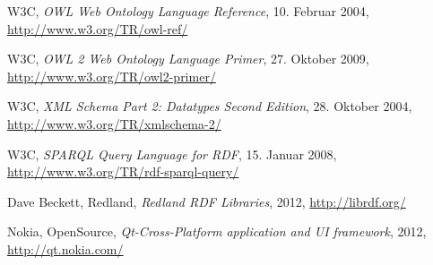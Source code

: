 \documentclass[
    11pt,
    latin1,
    a4paper,
    oneside
]{scrreprt}
\begin{document}
\newpage
{}
\listoffigures
{}
\listoftables
{}
\lstlistoflistings

\newpage
{}


\begin{thebibliography}{99}
  W3C,
  \emph{OWL Web Ontology Language Reference},
  10. Februar 2004,
  \url{http://www.w3.org/TR/owl-ref/}

  W3C,
  \emph{OWL 2 Web Ontology Language Primer},
  27. Oktober 2009,
  \url{http://www.w3.org/TR/owl2-primer/}

  W3C,
  \emph{XML Schema Part 2: Datatypes Second Edition},
  28. Oktober 2004,
  \url{http://www.w3.org/TR/xmlschema-2/}
  
  W3C,
  \emph{SPARQL Query Language for RDF},
  15. Januar 2008,
  \url{http://www.w3.org/TR/rdf-sparql-query/}

  Dave Beckett, Redland,
  \emph{Redland RDF Libraries},
  2012,
  \url{http://librdf.org/}

  Nokia, OpenSource,
  \emph{Qt-Cross-Platform application and UI framework},
  2012,
  \url{http://qt.nokia.com/}


\end{thebibliography}
\end{document}
